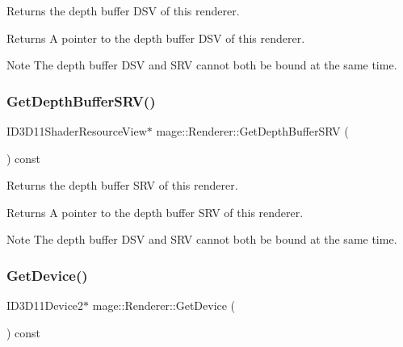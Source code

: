 Returns the depth buffer D\+SV of this renderer.

\begin{DoxyReturn}{Returns}
A pointer to the depth buffer D\+SV of this renderer. 
\end{DoxyReturn}
\begin{DoxyNote}{Note}
The depth buffer D\+SV and S\+RV cannot both be bound at the same time. 
\end{DoxyNote}
\hypertarget{classmage_1_1_renderer_a1e76970e43b0a4b734043f179d5f146d}{}\label{classmage_1_1_renderer_a1e76970e43b0a4b734043f179d5f146d} 
\subsubsection{\texorpdfstring{Get\+Depth\+Buffer\+S\+R\+V()}{GetDepthBufferSRV()}}
{\footnotesize\ttfamily I\+D3\+D11\+Shader\+Resource\+View$\ast$ mage\+::\+Renderer\+::\+Get\+Depth\+Buffer\+S\+RV (\begin{DoxyParamCaption}{ }\end{DoxyParamCaption}) const\hspace{0.3cm}{\ttfamily [noexcept]}}

Returns the depth buffer S\+RV of this renderer.

\begin{DoxyReturn}{Returns}
A pointer to the depth buffer S\+RV of this renderer. 
\end{DoxyReturn}
\begin{DoxyNote}{Note}
The depth buffer D\+SV and S\+RV cannot both be bound at the same time. 
\end{DoxyNote}
\hypertarget{classmage_1_1_renderer_a9510b8784447ed0fa9b43e7a4bf1fc80}{}\label{classmage_1_1_renderer_a9510b8784447ed0fa9b43e7a4bf1fc80} 
\subsubsection{\texorpdfstring{Get\+Device()}{GetDevice()}}
{\footnotesize\ttfamily I\+D3\+D11\+Device2$\ast$ mage\+::\+Renderer\+::\+Get\+Device (\begin{DoxyParamCaption}{ }\end{DoxyParamCaption}) const\hspace{0.3cm}{\ttfamily [noexcept]}}

